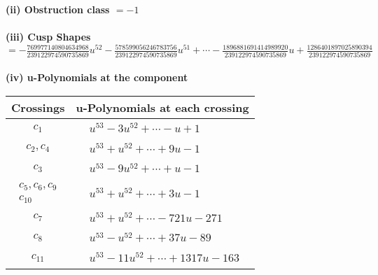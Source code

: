 \documentclass[1p]{elsarticle_modified}
\theoremstyle{definition}
\begin{document}
\flushleft \textbf{(ii) Obstruction class $= -1$}\\~\\
\flushleft \textbf{(iii) Cusp Shapes $= -\frac{769977140804634968}{239122974590735869} u^{52}-\frac{578599056246783756}{239122974590735869} u^{51}+\cdots-\frac{1896881691414989920}{239122974590735869} u+\frac{1286401897025890394}{239122974590735869}$}\\~\\
\newpage\renewcommand{\arraystretch}{1}
\flushleft \textbf{(iv) u-Polynomials at the component}\newline \\
\begin{tabular}{m{50pt}|m{274pt}}
Crossings & \hspace{64pt}u-Polynomials at each crossing \\
\hline $$\begin{aligned}c_{1}\end{aligned}$$&$\begin{aligned}
&u^{53}-3 u^{52}+\cdots- u+1
\end{aligned}$\\
\hline $$\begin{aligned}c_{2},c_{4}\end{aligned}$$&$\begin{aligned}
&u^{53}+u^{52}+\cdots+9 u-1
\end{aligned}$\\
\hline $$\begin{aligned}c_{3}\end{aligned}$$&$\begin{aligned}
&u^{53}-9 u^{52}+\cdots+u-1
\end{aligned}$\\
\hline $$\begin{aligned}c_{5},c_{6},c_{9}\\c_{10}\end{aligned}$$&$\begin{aligned}
&u^{53}+u^{52}+\cdots+3 u-1
\end{aligned}$\\
\hline $$\begin{aligned}c_{7}\end{aligned}$$&$\begin{aligned}
&u^{53}+u^{52}+\cdots-721 u-271
\end{aligned}$\\
\hline $$\begin{aligned}c_{8}\end{aligned}$$&$\begin{aligned}
&u^{53}- u^{52}+\cdots+37 u-89
\end{aligned}$\\
\hline $$\begin{aligned}c_{11}\end{aligned}$$&$\begin{aligned}
&u^{53}-11 u^{52}+\cdots+1317 u-163
\end{aligned}$\\
\hline
\end{tabular}\\~\\
\end{document}
